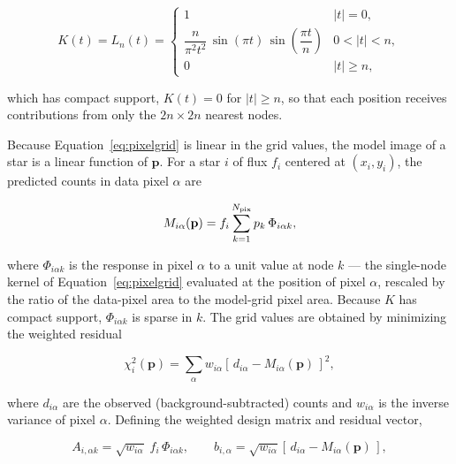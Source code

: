 \begin{equation}
    K(t) = L_n(t) =
    \begin{cases}
        1 & |t| = 0, \\[4pt]
        \dfrac{n}{\pi^2 t^2}\,\sin(\pi t)\,\sin\!\left(\dfrac{\pi t}{n}\right)
            & 0 < |t| < n, \\[6pt]
        0 & |t| \geq n,
    \end{cases}
    \label{eq:lanczos}
\end{equation}

which has compact support, $K(t)=0$ for $|t|\geq n$, so that each position
receives contributions from only the $2n\times 2n$ nearest nodes.

Because Equation~\eqref{eq:pixelgrid} is linear in the grid values, the model
image of a star is a linear function of $\mathbf{p}$. For a star $i$ of flux
$f_i$ centered at $(x_i,y_i)$, the predicted counts in data pixel $\alpha$ are

\begin{equation}
    M_{i\alpha}(\mathbf{p}) = f_i \sum_{k=1}^{N_{\rm pix}} p_k\, \Phi_{i\alpha k},
    \label{eq:model_counts}
\end{equation}

where $\Phi_{i\alpha k}$ is the response in pixel $\alpha$ to a unit value at
node $k$ --- the single-node kernel of Equation~\eqref{eq:pixelgrid} evaluated
at the position of pixel $\alpha$, rescaled by the ratio of the data-pixel area
to the model-grid pixel area. Because $K$ has compact support,
$\Phi_{i\alpha k}$ is sparse in $k$. The grid values are obtained by minimizing
the weighted residual

\begin{equation}
    \chi_i^2(\mathbf{p}) = \sum_\alpha w_{i\alpha}
        \left[\, d_{i\alpha} - M_{i\alpha}(\mathbf{p}) \,\right]^2,
    \label{eq:chi2_star}
\end{equation}

where $d_{i\alpha}$ are the observed (background-subtracted) counts and
$w_{i\alpha}$ is the inverse variance of pixel $\alpha$. Defining the weighted
design matrix and residual vector,

\begin{equation}
    A_{i,\alpha k} = \sqrt{w_{i\alpha}}\; f_i\, \Phi_{i\alpha k},
    \qquad
    b_{i,\alpha} = \sqrt{w_{i\alpha}}\left[\, d_{i\alpha}
                   - M_{i\alpha}(\mathbf{p}) \,\right],
    \label{eq:design_star}
\end{equation}

